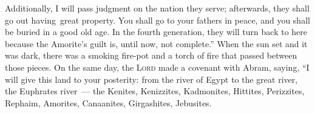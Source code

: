 \begin{inparaenum}
     Additionally, I will pass judgment on the nation they serve; afterwards, they shall go out having\understood\ great property.%
     You shall go to your fathers in peace, and you shall be buried in a good old age.%
     In the fourth generation, they will turn back to here because the Amorite's guilt is, until now, not complete.''%
     When the sun set and it was dark, there was a smoking fire-pot and a torch of fire that passed between those pieces.%
     On the same day, the \textsc{Lord} made a covenant with Abram, saying, ``I will give this land to your posterity: from the river of Egypt to the great river, the Euphrates river~---%
     the Kenites, Kenizzites, Kadmonites,%
     Hittites, Perizzites, Rephaim,%
     Amorites, Canaanites, Girgashites, Jebusites.%
\end{inparaenum}
